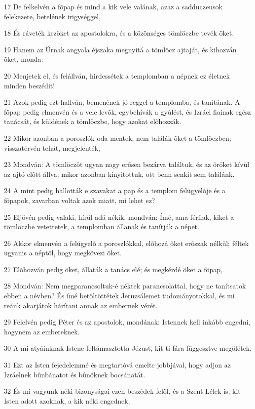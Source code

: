 \par 17 De felkelvén a fõpap és mind a kik vele valának, azaz a sadduczeusok felekezete, betelének irigységgel,
\par 18 És ráveték kezöket az apostolokra, és a közönséges tömlöczbe tevék õket.
\par 19 Hanem az Úrnak angyala éjszaka megnyitá a tömlöcz ajtaját, és kihozván õket, monda:
\par 20 Menjetek el, és felállván, hirdessétek a templomban a népnek ez életnek minden beszédit!
\par 21 Azok pedig ezt hallván, bemenének jó reggel a templomba, és tanítának. A fõpap pedig elmenvén és a vele levõk, egybehívák a gyûlést, és Izráel fiainak egész tanácsát, és küldének a tömlöczbe, hogy azokat elõhozzák.
\par 22 Mikor azonban a poroszlók oda mentek, nem találák õket a tömlöczben; visszatérvén tehát, megjelenték,
\par 23 Mondván: A tömlöczöt ugyan nagy erõsen bezárva találtuk, és az õröket kívül az ajtó elõtt állva; mikor azonban kinyitottuk, ott benn senkit sem találánk.
\par 24 A mint pedig hallották e szavakat a pap és a templom felügyelõje és a fõpapok, zavarban  voltak azok miatt, mi lehet ez?
\par 25 Eljövén pedig valaki, hírül adá nékik, mondván: Ímé, ama férfiak, kiket a tömlöczbe vetettetek, a templomban állanak és tanítják a népet.
\par 26 Akkor elmenvén a felügyelõ a poroszlókkal, elõhozá õket erõszak nélkül; féltek ugyanis a néptõl, hogy megkövezi õket.
\par 27 Elõhozván pedig õket, állaták a tanács elé; és megkérdé õket a fõpap,
\par 28 Mondván: Nem megparancsoltuk-é néktek parancsolattal, hogy ne tanítsatok ebben a névben? És ímé betöltöttétek Jeruzsálemet tudományotokkal, és mi reánk akarjátok hárítani annak az embernek  vérét.
\par 29 Felelvén pedig Péter és az apostolok, mondának: Istennek kell inkább engedni, hogynem az embereknek.
\par 30 A mi atyáinknak Istene feltámasztotta Jézust, kit ti fára függesztve megölétek.
\par 31 Ezt az Isten fejedelemmé és megtartóvá emelte jobbjával, hogy adjon az Izráelnek bûnbánatot  és bûnöknek bocsánatát.
\par 32 És mi vagyunk néki bizonyságai ezen beszédek felõl, és a Szent Lélek is, kit  Isten adott azoknak, a kik néki engednek.

